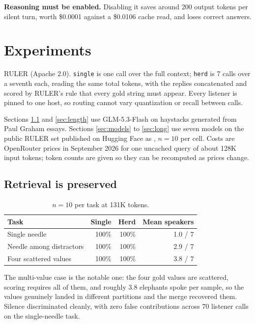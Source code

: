 \documentclass[11pt]{article}
\begin{document}
\textbf{Reasoning must be enabled.} Disabling it saves around 200 output tokens per
silent turn, worth \$0.0001 against a \$0.0106 cache read, and loses correct answers.

\section{Experiments}

RULER \cite{ruler} (Apache 2.0). \texttt{single} is one call over the full context;
\texttt{herd} is 7 calls over a seventh each, reading the same total tokens, with the
replies concatenated and scored by RULER's rule that every gold string must appear.
Every listener is pinned to one host, so routing cannot vary quantization or recall
between calls.

Sections \ref{sec:retrieval} and \ref{sec:length} use GLM-5.3-Flash on haystacks
generated from Paul Graham essays. Sections \ref{sec:models} to \ref{sec:long} use
seven models on the public RULER set published on Hugging Face as
, $n=10$ per cell. Costs are OpenRouter prices in
September 2026 for one uncached query of about 128K input tokens; token counts are
given so they can be recomputed as prices change.

\subsection{Retrieval is preserved}\label{sec:retrieval}

\begin{table}[h]
\centering
\begin{tabular}{lrrr}
\toprule
Task & Single & Herd & Mean speakers \\
\midrule
Single needle & 100\% & 100\% & 1.0 / 7 \\
Needle among distractors & 100\% & 100\% & 2.9 / 7 \\
Four scattered values & 100\% & 100\% & 3.8 / 7 \\
\bottomrule
\end{tabular}
\caption{$n=10$ per task at 131K tokens.}
\end{table}

The multi-value case is the notable one: the four gold values are scattered, scoring
requires all of them, and roughly 3.8 elephants spoke per sample, so the values
genuinely landed in different partitions and the merge recovered them. Silence
discriminated cleanly, with zero false contributions across 70 listener calls on the
single-needle task.
\end{document}
